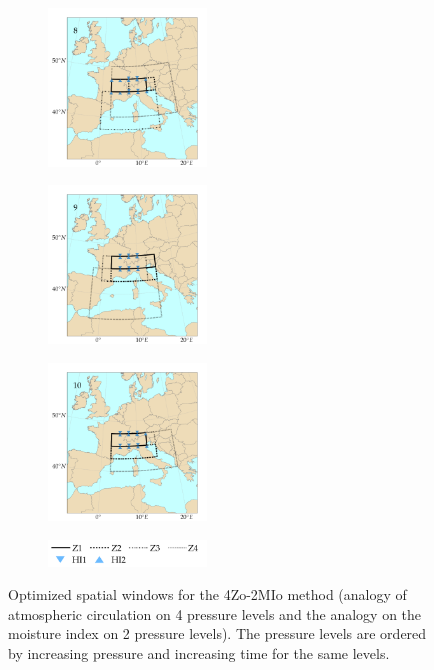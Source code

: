 \documentclass[5p]{elsarticle}
\begin{document}
\begin{figure}[htb]
\begin{subfigure}{.5\columnwidth}
	\end{subfigure}%
	\begin{subfigure}{.5\columnwidth}
		\centering
		\includegraphics[width=4.2cm]{figures/spatial_win_z4-hi2/Spatial_windows_8.png}
	\end{subfigure}
	\begin{subfigure}{.5\columnwidth}
		\centering
		\includegraphics[width=4.2cm]{figures/spatial_win_z4-hi2/Spatial_windows_9.png}
	\end{subfigure}%
	\begin{subfigure}{.5\columnwidth}
		\centering
		\includegraphics[width=4.2cm]{figures/spatial_win_z4-hi2/Spatial_windows_10.png}
	\end{subfigure}
	\begin{subfigure}{.5\columnwidth}
		\centering
		\includegraphics[width=4.2cm]{figures/spatial_win_z4-hi2/legend.png}
	\end{subfigure}
	\caption{Optimized spatial windows for the 4Zo-2MIo method (analogy of atmospheric circulation on 4 pressure levels and the analogy on the moisture index on 2 pressure levels). The pressure levels are ordered by increasing pressure and increasing time for the same levels.}
	\label{fig:spatial_windows_4Zo-2MIo}
\end{figure}
\end{document}
